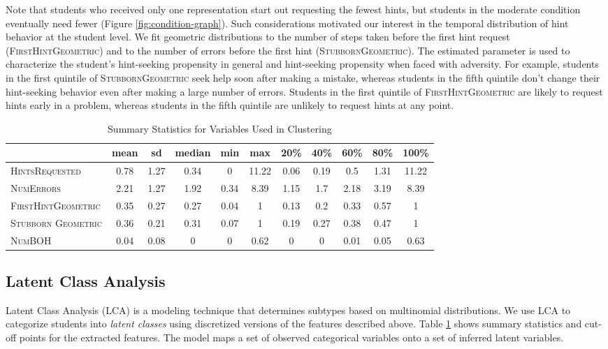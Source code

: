 \documentclass{edm_template}
\newcommand{\ftr}[1]{\textsc{#1}}
\begin{document}
Note that students who received only one representation start out requesting the fewest hints, but students in the moderate condition eventually need fewer  (Figure \ref{fig:condition-graph}). Such considerations motivated our interest in the temporal distribution of hint behavior at the student level. We fit geometric distributions to the number of steps taken before the first hint request (\ftr{FirstHintGeometric}) and to the number of errors before the first hint (\ftr{StubbornGeometric}). The estimated parameter is used to characterize the student's hint-seeking propensity in general and hint-seeking propensity when faced with adversity. For example, students in the first quintile of \ftr{StubbornGeometric} seek help soon after making a mistake, whereas students in the fifth quintile don't change their hint-seeking behavior even after making a large number of errors. Students in the first quintile of \ftr{FirstHintGeometric} are likely to request hints early in a problem, whereas students in the fifth quintile are unlikely to request hints at any point.
\begin{table}[htbp]
\caption{Summary Statistics for Variables Used in Clustering}
\begin{center}
\begin{tabular}{| l || c | c || c | c | c || c | c | c | c | c |}
\hline
&mean& sd&median&min&max&20\%&40\%&60\%&	80\%&100\%\\ \hline \hline
\ftr{HintsRequested}&0.78&1.27&0.34&0&11.22&0.06&0.19&0.5&1.31&11.22\\ \hline
\ftr{NumErrors}&2.21&1.27&1.92&0.34&8.39&1.15&1.7&2.18&3.19&8.39\\ \hline 
\ftr{FirstHintGeometric}&0.35&0.27&0.27&0.04&1&0.13&0.2&0.33&0.57&1\\ \hline
\ftr{Stubborn Geometric}&0.36&0.21&0.31&0.07&1&0.19&0.27&0.38&0.47&1\\ \hline
\ftr{NumBOH}&0.04&0.08&0&0&0.62&0&0&0.01&0.05&0.63\\ \hline
 \end{tabular}
\end{center}
\label{tab:sumstats}
\end{table}

\subsection{Latent Class Analysis}
\label{sec:LCA}

Latent Class Analysis (LCA) is a modeling technique that determines subtypes based on multinomial distributions. We use LCA to categorize students into \emph{latent classes} using discretized versions of the features described above. Table \ref{tab:sumstats} shows summary statistics and cut-off points for the extracted features. The model maps a set of observed categorical variables onto a set of inferred latent variables. 
\end{document}

